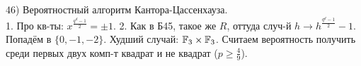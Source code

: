 46) Вероятностный алгоритм Кантора-Цассенхауза.\\
1. Про кв-ты: $x^{\frac{q^d-1}{2}}=\pm 1$. 2. Как в Б45, такое же $R$, оттуда случ-й $h \rightarrow h^\frac{q^d-1}{2}-1$. Попадём в $\{0, -1, -2\}$. Худший случай: $\mathbb{F}_3 \times \mathbb{F}_3$. Считаем вероятность получить среди первых двух комп-т квадрат и не квадрат ($p\ge \frac{4}{9}$).\\

